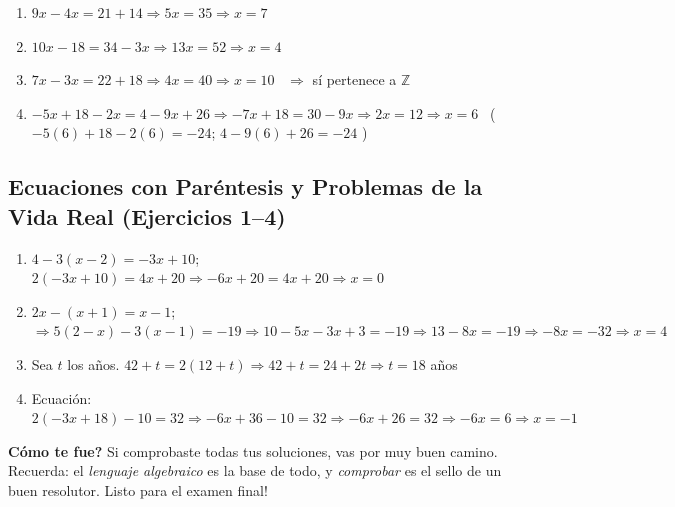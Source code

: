 \documentclass[12pt, letterpaper]{article}
\newcommand{\Z}{\mathbb{Z}}
\begin{document}
  \begin{enumerate}[leftmargin=*, label=\textbf{\arabic*.}]
    \item $9x - 4x = 21 + 14 \Rightarrow 5x = 35 \Rightarrow x = 7$
    \item $10x - 18 = 34 - 3x \Rightarrow 13x = 52 \Rightarrow x = 4$
    \item $7x - 3x = 22 + 18 \Rightarrow 4x = 40 \Rightarrow x = 10$ \ $\Rightarrow$ sí pertenece a $\Z$
    \item $-5x + 18 - 2x = 4 - 9x + 26 \Rightarrow -7x + 18 = 30 - 9x \Rightarrow 2x = 12 \Rightarrow x = 6$ \ ($-5(6)+18-2(6) = -24$; $4-9(6)+26 = -24$ \checkmark)
  \end{enumerate}

  \subsection*{Ecuaciones con Paréntesis y Problemas de la Vida Real (Ejercicios 1--4)}

  \begin{enumerate}[leftmargin=*, label=\textbf{\arabic*.}]
    \item $4 - 3(x - 2) = -3x + 10$; $2(-3x + 10) = 4x + 20 \Rightarrow -6x + 20 = 4x + 20 \Rightarrow x = 0$
    \item $2x - (x + 1) = x - 1$; $\Rightarrow 5(2 - x) - 3(x - 1) = -19 \Rightarrow 10 - 5x - 3x + 3 = -19 \Rightarrow 13 - 8x = -19 \Rightarrow -8x = -32 \Rightarrow x = 4$
    \item Sea $t$ los años. $42 + t = 2(12 + t) \Rightarrow 42 + t = 24 + 2t \Rightarrow t = 18$ años
    \item Ecuación: $2(-3x + 18) - 10 = 32 \Rightarrow -6x + 36 - 10 = 32 \Rightarrow -6x + 26 = 32 \Rightarrow -6x = 6 \Rightarrow x = -1$
  \end{enumerate}

  \vspace{10pt}
  \begin{cuadrosolucion}
    \textbf{\textquestiondown Cómo te fue?} Si comprobaste todas tus soluciones, vas por muy buen camino. Recuerda: el \emph{lenguaje algebraico} es la base de todo, y \emph{comprobar} es el sello de un buen resolutor. \textquestiondown Listo para el examen final!
  \end{cuadrosolucion}

\fi
\end{document}
